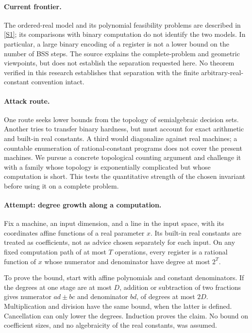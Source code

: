 \documentclass[11pt,a4paper]{article}
\newcommand{\sref}[2]{\hyperlink{source:#1:#2}{[S#2]}}
\numberwithin{equation}{section}
\begin{document}
\paragraph{Current frontier.}
The ordered-real model and its polynomial feasibility problems are described
in \sref{statement}{1}; its comparisons with binary computation do not identify
the two models. In particular, a large binary encoding of a register is
not a lower bound on the number of BSS steps. The source explains the
complete-problem and geometric viewpoints, but does not establish the
separation requested here. No theorem verified in this research establishes
that separation with the finite arbitrary-real-constant convention intact.

\paragraph{Attack route.}
One route seeks lower bounds from the topology of semialgebraic decision
sets. Another tries to transfer binary hardness, but must account for exact
arithmetic and built-in real constants. A third would diagonalize against
real machines; a countable enumeration of rational-constant programs does
not cover the present machines. We pursue a concrete topological counting
argument and challenge it with a family whose topology is exponentially
complicated but whose computation is short. This tests the quantitative
strength of the chosen invariant before using it on a complete problem.

\paragraph{Attempt: degree growth along a computation.}
Fix a machine, an input dimension, and a line in the input space, with its
coordinates affine functions of a real parameter $x$. Its built-in real
constants are treated as coefficients, not as advice chosen separately for
each input. On any fixed computation path of at most $T$ operations, every
register is a rational function of $x$ whose numerator and denominator
have degree at most $2^T$.

To prove the bound, start with affine polynomials and constant denominators.
If the degrees at one stage are at most $D$, addition or subtraction of two
fractions gives numerator $ad\pm bc$ and denominator $bd$, of degrees at
most $2D$. Multiplication and division have the same bound, when the latter
is defined. Cancellation can only lower the degrees. Induction proves the
claim. No bound on coefficient sizes, and no algebraicity of the real
constants, was assumed.
\end{document}
